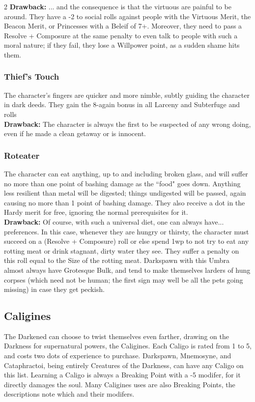 \begin{multicols}{2}
\noindent \textbf{Drawback:} ... and the consequence is that the virtuous are painful to be around. They have a -2 to social rolls against people with the Virtuous Merit, the Beacon Merit, or Princesses with a Beleif of 7+. Moreover, they need to pass a Resolve + Composure at the same penalty to even talk to people with such a moral nature; if they fail, they lose a Willpower point, as a sudden shame hits them. 

\subsubsection*{Thief's Touch}
The character’s fingers are quicker and more nimble, subtly guiding the character in dark deeds. They gain the 8-again bonus in all Larceny and Subterfuge and rolls\\

\noindent \textbf{Drawback:} The character is always the first to be suspected of any wrong doing, even if he made a clean getaway or is innocent. 
 
\subsubsection*{Roteater}
The character can eat anything, up to and including broken glass, and will suffer no more than one point of bashing damage as the \textquotedblleft food" goes down. Anything less resilient than metal will be digested; things undigested will be passed, again causing no more than 1 point of bashing damage. They also receive a dot in the Hardy merit for free, ignoring the normal prerequisites for it. \\

\noindent \textbf{Drawback:} Of course, with such a universal diet, one can always have... preferences. In this case, whenever they are hungry or thirsty, the character must succeed on a (Resolve + Composure) roll or else spend 1wp to not try to eat any rotting meat or drink stagnant, dirty water they see. They suffer a penalty on this roll equal to the Size of the rotting meat. Darkspawn with this Umbra almost always have Grotesque Bulk, and tend to make themselves larders of hung corpses (which need not be human; the first sign may well be all the pets going missing) in case they get peckish. 

\subsection*{Caligines}
\label{subsec:Caligines}
The Darkened can choose to twist themselves even farther, drawing on the Darkness for supernatural powers, the Caligines. Each Caligo is rated from 1 to 5, and costs two dots of experience to purchase. Darkspawn, Mnemosyne, and Cataphractoi, being entirely Creatures of the Darkness, can have any Caligo on this list. Learning a Caligo is always a Breaking Point with a -5 modifer, for it directly damages the soul. Many Caligines uses are also Breaking Points, the descriptions note which and their modifers.


\end{multicols}
